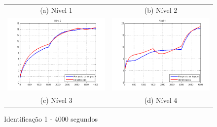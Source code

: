\begin{itemize}
\begin{figure}[H]
\begin{tabular}{cc}
		(a) Nível 1 &
		(b) Nível 2 \\
		\includegraphics[height=0.15\paperheight,keepaspectratio]{img/ident1_h3.png} &
		\includegraphics[height=0.15\paperheight,keepaspectratio]{img/ident1_h4.png} \\
		(c) Nível 3 &
		(d) Nível 4
	\end{tabular}
	\caption{\label{imgID_4Results} Identificação 1 - 4000 segundos}
\end{figure}


\end{itemize}
